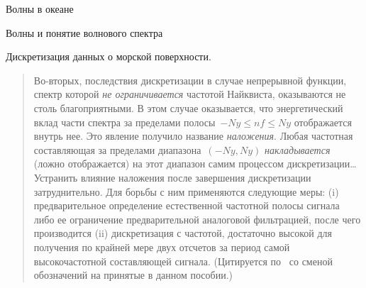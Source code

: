 \begin{chapter}{Волны в океане}
\begin{section}{Волны и понятие волнового спектра}
\begin{paragraph}{Дискретизация данных о морской поверхности.}
\begin{quotation}
Во-вторых, последствия дискретизации в случае непрерывной функции, спектр
которой \emph{не ограничивается} частотой Найквиста, оказываются не столь
благоприятными. В этом случае оказывается, что энергетический вклад части
спектра за пределами полосы~$-Ny \le nf \le Ny$ отображается внутрь нее.
Это явление получило название \emph{наложения}. Любая частотная составляющая
за пределами диапазона~$(-Ny, Ny)$ \emph{накладывается} (ложно отображается)
на этот диапазон самим процессом дискретизации\dots{}
Устранить влияние наложения после завершения дискретизации затруднительно.
Для борьбы с ним применяются следующие меры:
(i) предварительное определение естественной частотной полосы сигнала
либо ее ограничение предварительной аналоговой фильтрацией, после чего 
производится (ii) дискретизация с частотой, достаточно высокой для получения
по крайней мере двух отсчетов за период самой высокочастотной составляющей 
сигнала. (Цитируется по~\cite{Press:1992} со сменой обозначений на принятые
в данном пособии.)
%
\end{quotation}


\end{paragraph}
\end{section}
\end{chapter}
